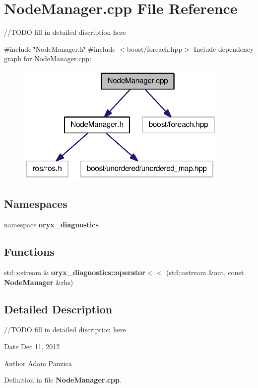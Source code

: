 \section{\-Node\-Manager.\-cpp \-File \-Reference}
\label{NodeManager_8cpp}


//\-T\-O\-D\-O fill in detailed discription here  


{\ttfamily \#include \char`\"{}\-Node\-Manager.\-h\char`\"{}}\*
{\ttfamily \#include $<$boost/foreach.\-hpp$>$}\*
\-Include dependency graph for \-Node\-Manager.\-cpp\-:
\nopagebreak
\begin{figure}[H]
\begin{center}
\leavevmode
\includegraphics[width=292pt]{NodeManager_8cpp__incl}
\end{center}
\end{figure}
\subsection*{\-Namespaces}
\begin{DoxyCompactItemize}
\item 
namespace {\bf oryx\-\_\-diagnostics}
\end{DoxyCompactItemize}
\subsection*{\-Functions}
\begin{DoxyCompactItemize}
\item 
std\-::ostream \& {\bf oryx\-\_\-diagnostics\-::operator$<$$<$} (std\-::ostream \&out, const {\bf \-Node\-Manager} \&rhs)
\end{DoxyCompactItemize}


\subsection{\-Detailed \-Description}
//\-T\-O\-D\-O fill in detailed discription here \begin{DoxyDate}{\-Date}
\-Dec 11, 2012 
\end{DoxyDate}
\begin{DoxyAuthor}{\-Author}
\-Adam \-Panzica 
\end{DoxyAuthor}


\-Definition in file {\bf \-Node\-Manager.\-cpp}.

